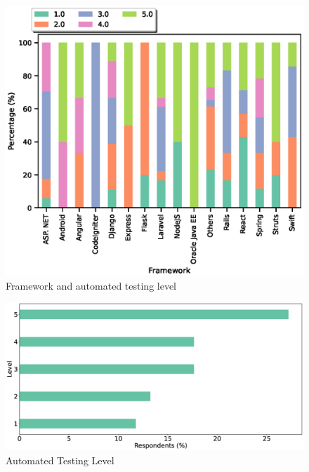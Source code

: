 \begin{figure}[h]
\centering
  \includegraphics[scale=0.65]{Figures/Framework_and_Test_Level}
  \caption{Framework and automated testing level}
  \label{fig:framework and autotest}
\end{figure}

\begin{figure}[h]
\centering
  \includegraphics[scale=0.15]{Figures/Respondents_autotest_level}
  \caption{Automated Testing Level}
  \label{fig:autoTest}
\end{figure}



